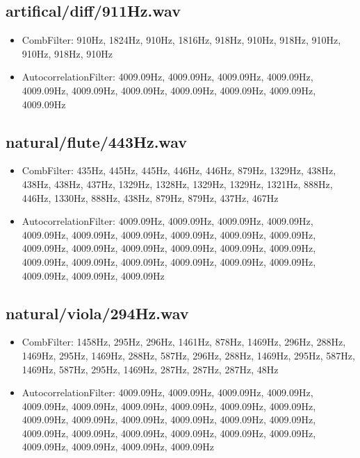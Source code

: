 \documentclass{classrep}
\begin{document}
\subsection{artifical/diff/911Hz.wav}
\begin{itemize}
 \item CombFilter: 910Hz, 1824Hz, 910Hz, 1816Hz, 918Hz, 910Hz, 918Hz, 910Hz, 910Hz, 918Hz, 910Hz
 \item AutocorrelationFilter: 4009.09Hz, 4009.09Hz, 4009.09Hz, 4009.09Hz, 4009.09Hz, 4009.09Hz, 4009.09Hz, 4009.09Hz, 4009.09Hz, 4009.09Hz, 4009.09Hz
\end{itemize}

\subsection{natural/flute/443Hz.wav}
\begin{itemize}
 \item CombFilter: 435Hz, 445Hz, 445Hz, 446Hz, 446Hz, 879Hz, 1329Hz, 438Hz, 438Hz, 438Hz, 437Hz, 1329Hz, 1328Hz, 1329Hz, 1329Hz, 1321Hz, 888Hz, 446Hz, 1330Hz, 888Hz, 438Hz, 879Hz, 879Hz, 437Hz, 467Hz
 \item AutocorrelationFilter: 4009.09Hz, 4009.09Hz, 4009.09Hz, 4009.09Hz, 4009.09Hz, 4009.09Hz, 4009.09Hz, 4009.09Hz, 4009.09Hz, 4009.09Hz, 4009.09Hz, 4009.09Hz, 4009.09Hz, 4009.09Hz, 4009.09Hz, 4009.09Hz, 4009.09Hz, 4009.09Hz, 4009.09Hz, 4009.09Hz, 4009.09Hz, 4009.09Hz, 4009.09Hz, 4009.09Hz, 4009.09Hz
\end{itemize}

\subsection{natural/viola/294Hz.wav}
\begin{itemize}
 \item CombFilter: 1458Hz, 295Hz, 296Hz, 1461Hz, 878Hz, 1469Hz, 296Hz, 288Hz, 1469Hz, 295Hz, 1469Hz, 288Hz, 587Hz, 296Hz, 288Hz, 1469Hz, 295Hz, 587Hz, 1469Hz, 587Hz, 295Hz, 1469Hz, 287Hz, 287Hz, 287Hz, 48Hz
 \item AutocorrelationFilter: 4009.09Hz, 4009.09Hz, 4009.09Hz, 4009.09Hz, 4009.09Hz, 4009.09Hz, 4009.09Hz, 4009.09Hz, 4009.09Hz, 4009.09Hz, 4009.09Hz, 4009.09Hz, 4009.09Hz, 4009.09Hz, 4009.09Hz, 4009.09Hz, 4009.09Hz, 4009.09Hz, 4009.09Hz, 4009.09Hz, 4009.09Hz, 4009.09Hz, 4009.09Hz, 4009.09Hz, 4009.09Hz, 4009.09Hz
\end{itemize}
\end{document}
